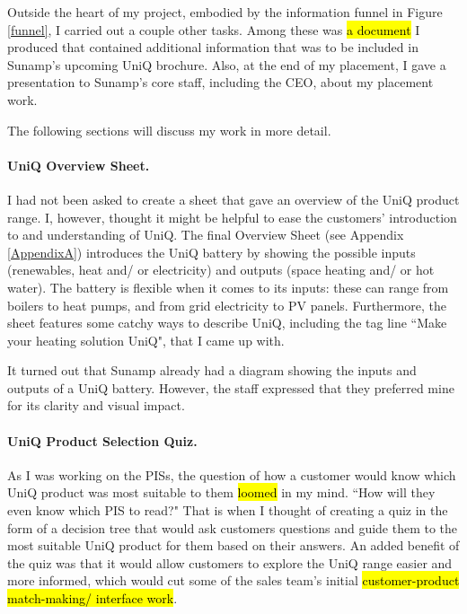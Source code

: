 Outside the heart of my project, embodied by the information funnel in Figure \ref{funnel}, I carried out a couple other tasks.
Among these was \hl{a document} I produced that contained additional information that was to be included in Sunamp's upcoming UniQ brochure.
Also, at the end of my placement, I gave a presentation to Sunamp's core staff, including the CEO, about my placement work.

The following sections will discuss my work in more detail.



\paragraph{UniQ Overview Sheet.}

I had not been asked to create a sheet that gave an overview of the UniQ product range.
I, however, thought it might be helpful to ease the customers' introduction to and understanding of UniQ.
The final Overview Sheet (see Appendix \ref{AppendixA}) introduces the UniQ battery by showing the possible inputs (renewables, heat and/ or electricity) and outputs (space heating and/ or hot water).
The battery is flexible when it comes to its inputs: these can range from boilers to heat pumps, and from grid electricity to PV panels.
Furthermore, the sheet features some catchy ways to describe UniQ, including the tag line ``Make your heating solution UniQ", that I came up with.

It turned out that Sunamp already had a diagram showing the inputs and outputs of a UniQ battery.
However, the staff expressed that they preferred mine for its clarity and visual impact.



\paragraph{UniQ Product Selection Quiz.}

As I was working on the PISs, the question of how a customer would know which UniQ product was most suitable to them \hl{loomed} in my mind.
``How will they even know which PIS to read?"
That is when I thought of creating a quiz in the form of a decision tree that would ask customers questions and guide them to the most suitable UniQ product for them based on their answers.
An added benefit of the quiz was that it would allow customers to explore the UniQ range easier and more informed, which would cut some of the sales team's initial \hl{customer-product match-making/ interface work}.

